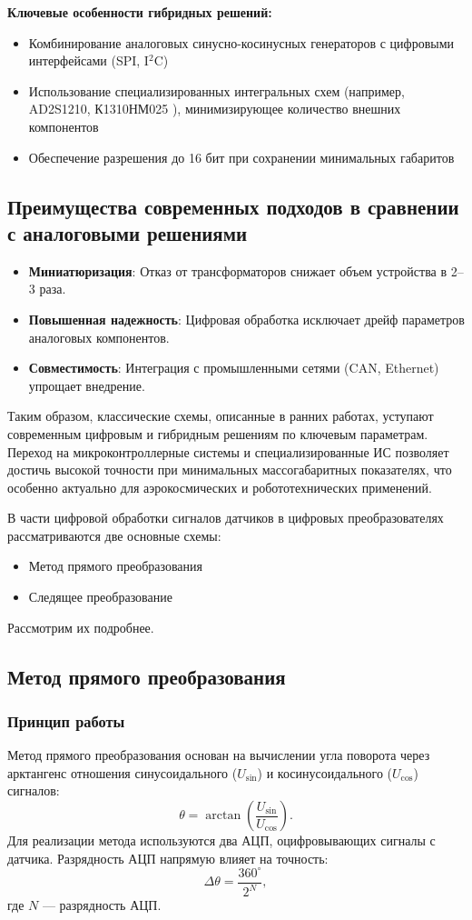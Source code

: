 \textbf{Ключевые особенности гибридных решений:}
\begin{itemize}
    \item Комбинирование аналоговых синусно-косинусных генераторов с цифровыми интерфейсами (SPI, I$^2$C)
    \item Использование специализированных интегральных схем (например, AD2S1210, К1310НМ025 \cite{Spec}), минимизирующее количество внешних компонентов
    \item Обеспечение разрешения до 16 бит при сохранении минимальных габаритов
\end{itemize}

\subsection{Преимущества современных подходов в сравнении с аналоговыми решениями}
\begin{itemize}
    \item \textbf{Миниатюризация}: Отказ от трансформаторов снижает объем устройства в 2–3 раза.
    \item \textbf{Повышенная надежность}: Цифровая обработка исключает дрейф параметров аналоговых компонентов.
    \item \textbf{Совместимость}: Интеграция с промышленными сетями (CAN, Ethernet) упрощает внедрение.
\end{itemize}

Таким образом, классические схемы, описанные в ранних работах, уступают современным цифровым и гибридным решениям по ключевым параметрам. 
Переход на микроконтроллерные системы и специализированные ИС позволяет достичь высокой точности при минимальных массогабаритных показателях, 
что особенно актуально для аэрокосмических и робототехнических применений.

В части цифровой обработки сигналов датчиков в цифровых преобразователях рассматриваются две основные схемы:
\begin{itemize}
    \item Метод прямого преобразования
    \item Следящее преобразование
\end{itemize}
Рассмотрим их подробнее.

\subsection{Метод прямого преобразования}
\subsubsection{Принцип работы}
Метод прямого преобразования \cite{Armenski} основан на вычислении угла поворота через арктангенс отношения синусоидального (\(U_{\sin}\)) и косинусоидального (\(U_{\cos}\)) сигналов:
\[
\theta = \arctan\left(\frac{U_{\sin}}{U_{\cos}}\right).
\]
Для реализации метода используются два АЦП, оцифровывающих сигналы с датчика. Разрядность АЦП напрямую влияет на точность: 
\[
\Delta\theta = \frac{360^\circ}{2^N},
\]
где \(N\) — разрядность АЦП.

